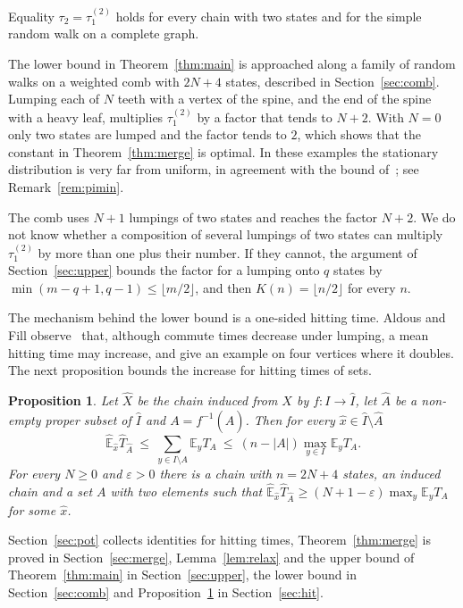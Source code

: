 \documentclass[11pt]{amsart}
\newtheorem{proposition}[theorem]{Proposition}
\theoremstyle{definition}
\newcommand{\E}{\mathbb{E}}
\newcommand{\tmix}{\tau_1^{(2)}}
\newcommand{\hE}{\widehat{\E}}
\newcommand{\hI}{\widehat{I}}
\newcommand{\hA}{\widehat{A}}
\newcommand{\hX}{\widehat{X}}
\begin{document}
Equality $\tau_2=\tmix$ holds for every chain with two states and for the simple random walk on a complete graph.

The lower bound in Theorem~\ref{thm:main} is approached along a family of random walks on a weighted comb with $2N+4$
states, described in Section~\ref{sec:comb}. Lumping each of $N$ teeth with a vertex of the spine, and the end of the
spine with a heavy leaf, multiplies $\tmix$ by a factor that tends to $N+2$. With $N=0$ only two states are lumped and
the factor tends to $2$, which shows that the constant in Theorem~\ref{thm:merge} is optimal. In these examples the
stationary distribution is very far from uniform, in agreement with the bound of~\cite{HP}; see
Remark~\ref{rem:pimin}.

The comb uses $N+1$ lumpings of two states and reaches the factor $N+2$. We do not know whether a composition of
several lumpings of two states can multiply $\tmix$ by more than one plus their number. If they cannot, the argument of
Section~\ref{sec:upper} bounds the factor for a lumping onto $q$ states by $\min(m-q+1,q-1)\le\lfloor m/2\rfloor$, and
then $K(n)=\lfloor n/2\rfloor$ for every $n$.

The mechanism behind the lower bound is a one-sided hitting time. Aldous and Fill observe~\cite[Section~4.6.1]{AF}
that, although commute times decrease under lumping, a mean hitting time may increase, and give an example on four
vertices where it doubles. The next proposition bounds the increase for hitting times of sets.

\begin{proposition}\label{prop:hit}
Let $\hX$ be the chain induced from $X$ by $f:I\to\hI$, let $\hA$ be a non-empty proper subset of $\hI$ and
$A=f^{-1}(\hA)$. Then for every $\hat x\in\hI\setminus\hA$
\[
\hE_{\hat x}\widehat{T}_{\hA}\ \le\ \sum_{y\in I\setminus A}\E_yT_A\ \le\ (n-|A|)\max_{y\in I}\E_yT_A .
\]
For every $N\ge0$ and $\varepsilon>0$ there is a chain with $n=2N+4$ states, an induced chain and a set $A$ with two
elements such that $\hE_{\hat x}\widehat{T}_{\hA}\ge(N+1-\varepsilon)\max_y\E_yT_A$ for some $\hat x$.
\end{proposition}

Section~\ref{sec:pot} collects identities for hitting times, Theorem~\ref{thm:merge} is proved in
Section~\ref{sec:merge}, Lemma~\ref{lem:relax} and the upper bound of Theorem~\ref{thm:main} in
Section~\ref{sec:upper}, the lower bound in Section~\ref{sec:comb} and Proposition~\ref{prop:hit} in
Section~\ref{sec:hit}.
\end{document}
